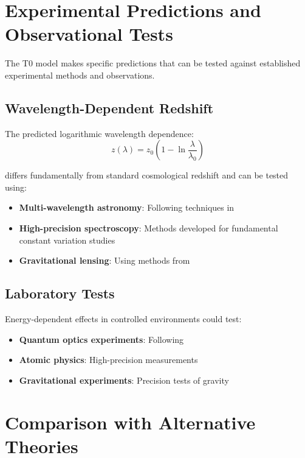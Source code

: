 \documentclass[12pt,a4paper]{article}
\begin{document}
	\section{Experimental Predictions and Observational Tests}
	\label{sec:experimental_tests}
	
	The T0 model makes specific predictions that can be tested against established experimental methods and observations.
	
	\subsection{Wavelength-Dependent Redshift}
	\label{subsec:wavelength_redshift}
	
	The predicted logarithmic wavelength dependence:
	\begin{equation}
		z(\lambda) = z_0\left(1 - \ln\frac{\lambda}{\lambda_0}\right)
	\end{equation}
	
	differs fundamentally from standard cosmological redshift and can be tested using:
	\begin{itemize}
		\item \textbf{Multi-wavelength astronomy}: Following techniques in \citep{longair2011,carroll2006}
		\item \textbf{High-precision spectroscopy}: Methods developed for fundamental constant variation studies \citep{uzan2003,murphy2003}
		\item \textbf{Gravitational lensing}: Using methods from \citep{schneider1992,bartelmann2001}
	\end{itemize}
	
	\subsection{Laboratory Tests}
	\label{subsec:laboratory_tests}
	
	Energy-dependent effects in controlled environments could test:
	\begin{itemize}
		\item \textbf{Quantum optics experiments}: Following \citep{scully1997,knight1998}
		\item \textbf{Atomic physics}: High-precision measurements \citep{demtroder2008}
		\item \textbf{Gravitational experiments}: Precision tests of gravity \citep{will2014,adelberger2003}
	\end{itemize}
	
	\section{Comparison with Alternative Theories}
	\label{sec:alternative_theories}
	
\end{document}
